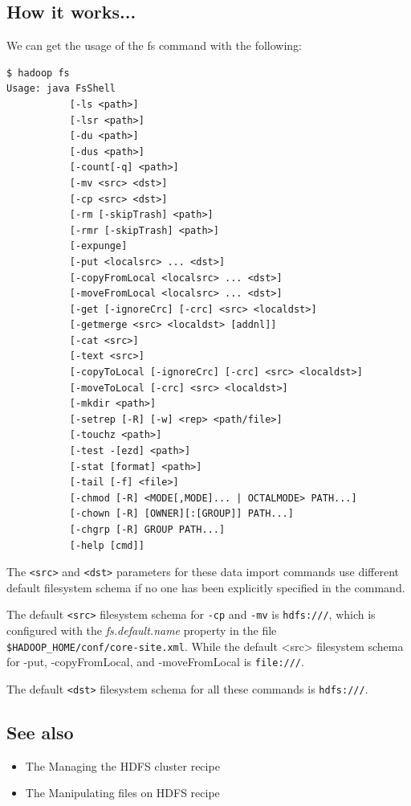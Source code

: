 \subsection*{How it works...}
We can get the usage of the fs command with the following:
\lstset{style=bashstyle}
\begin{lstlisting}
$ hadoop fs
Usage: java FsShell
           [-ls <path>]
           [-lsr <path>]
           [-du <path>]
           [-dus <path>]
           [-count[-q] <path>]
           [-mv <src> <dst>]
           [-cp <src> <dst>]
           [-rm [-skipTrash] <path>]
           [-rmr [-skipTrash] <path>]
           [-expunge]
           [-put <localsrc> ... <dst>]
           [-copyFromLocal <localsrc> ... <dst>]
           [-moveFromLocal <localsrc> ... <dst>]
           [-get [-ignoreCrc] [-crc] <src> <localdst>]
           [-getmerge <src> <localdst> [addnl]]
           [-cat <src>]
           [-text <src>]
           [-copyToLocal [-ignoreCrc] [-crc] <src> <localdst>]
           [-moveToLocal [-crc] <src> <localdst>]
           [-mkdir <path>]
           [-setrep [-R] [-w] <rep> <path/file>]
           [-touchz <path>]
           [-test -[ezd] <path>]
           [-stat [format] <path>]
           [-tail [-f] <file>]
           [-chmod [-R] <MODE[,MODE]... | OCTALMODE> PATH...]
           [-chown [-R] [OWNER][:[GROUP]] PATH...]
           [-chgrp [-R] GROUP PATH...]
           [-help [cmd]]
\end{lstlisting}
The \verb|<src>| and \verb|<dst>| parameters for these data import commands use different default filesystem schema if no one has been explicitly specified in the command.

The default \verb|<src>| filesystem schema for \verb|-cp| and \verb|-mv| is \verb|hdfs:///|, which is configured with the \emph{fs.default.name} property in the file \verb|$HADOOP_HOME/conf/core-site.xml|. While the default <src> filesystem schema for -put, -copyFromLocal, and -moveFromLocal is \verb|file:///|.

The default \verb|<dst>| filesystem schema for all these commands is \verb|hdfs:///|.
\subsection*{See also}
  \begin{itemize}
  \item The Managing the HDFS cluster recipe
  \item The Manipulating files on HDFS recipe
\end{itemize}

